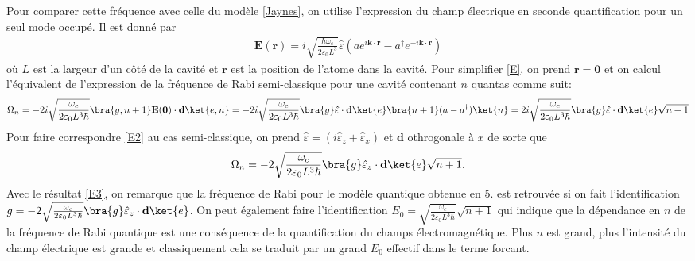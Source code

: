 Pour comparer cette fréquence avec celle du modèle \eqref{Jaynes}, on utilise l'expression du champ électrique en seconde quantification pour un seul mode occupé. Il est donné par 
    \begin{align}
        \mathbf{E}(\mathbf{r})=i \sqrt{\frac{\hbar \omega_c}{2 \varepsilon_0 L^3}} \hat{\varepsilon}\left(a e^{i \mathbf{k} \cdot \mathbf{r}}-a^{\dagger} e^{-i \mathbf{k} \cdot \mathbf{r}}\right)\label{E}
    \end{align}
    où $L$ est la largeur d'un côté de la cavité et $\mathbf{r}$ est la position de l'atome dans la cavité. Pour simplifier \eqref{E}, on prend $\mathbf{r}= \mathbf{0}$ et on calcul l'équivalent de l'expression de la fréquence de Rabi semi-classique pour une cavité contenant $n$ quantas comme suit:
    \begin{align}
        \Omega_n = -2 i \sqrt{\frac{\omega_c}{2 \varepsilon_0 L^3 \hbar}} \bra{g, n + 1} \mathbf{E}(\mathbf{0}) \cdot \mathbf{d} \ket{e, n} = -2i \sqrt{\frac{\omega_c}{2 \varepsilon_0 L^3 \hbar}} \bra{g} \hat{\varepsilon} \cdot \mathbf{d} \ket{e} \bra{n+1} (a-a^{\dagger}) \ket{n} = 2i \sqrt{\frac{\omega_c}{2 \varepsilon_0 L^3\hbar }} \bra{g} \hat{\varepsilon} \cdot \mathbf{d} \ket{e} \sqrt{n+1} \label{E2}
    \end{align}
    Pour faire correspondre \eqref{E2} au cas semi-classique, on prend $\hat{\varepsilon} = (i\hat{\varepsilon}_z + \hat{\varepsilon}_x)$ et $\mathbf{d}$ othrogonale à $x$ de sorte que 
    \begin{align}
        \Omega_n = -2 \sqrt{\frac{\omega_c}{2 \varepsilon_0 L^3\hbar }} \bra{g} \hat{\varepsilon}_z \cdot \mathbf{d} \ket{e} \sqrt{n+1} \label{E3}.
    \end{align}
    Avec le résultat \eqref{E3}, on remarque que la fréquence de Rabi pour le modèle quantique obtenue en 5. est retrouvée si on fait l'identification $g =-2 \sqrt{\frac{\omega_c}{2 \varepsilon_0 L^3\hbar }} \bra{g} \hat{\varepsilon}_z \cdot \mathbf{d} \ket{e}$. On peut également faire l'identification $E_0 = \sqrt{\frac{\omega_c}{2 \varepsilon_0 L^3\hbar }} \sqrt{n+1}$ qui indique que la dépendance en $n$ de la fréquence de Rabi quantique est une conséquence de la quantification du champs électromagnétique. Plus $n$ est grand, plus l'intensité du champ électrique est grande et classiquement cela se traduit par un grand $E_0$ effectif dans le terme forcant. 



